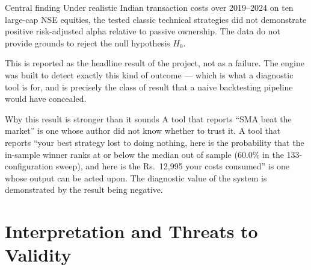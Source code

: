 \documentclass[12pt,a4paper,oneside]{report}
\newcommand{\rupee}{Rs.\ }
\begin{document}
\begin{resultbox}{Central finding}
Under realistic Indian transaction costs over 2019--2024 on ten large-cap NSE
equities, the tested classic technical strategies did not demonstrate positive
risk-adjusted alpha relative to passive ownership. The data do not provide
grounds to reject the null hypothesis $H_0$.

This is reported as the headline result of the project, not as a failure. The
engine was built to detect exactly this kind of outcome --- which is what a
diagnostic tool is for, and is precisely the class of result that a naive
backtesting pipeline would have concealed.
\end{resultbox}

\begin{negativebox}{Why this result is stronger than it sounds}
A tool that reports ``SMA beat the market'' is one whose author did not know
whether to trust it. A tool that reports ``your best strategy lost to doing
nothing, here is the probability that the in-sample winner ranks at or below the
median out of sample (60.0\% in the 133-configuration sweep), and here is the
\rupee{}12{,}995 your costs consumed'' is one whose
output can be acted upon. The diagnostic value of the system is demonstrated by
the result being negative.
\end{negativebox}

\section{Interpretation and Threats to Validity}
\end{document}
